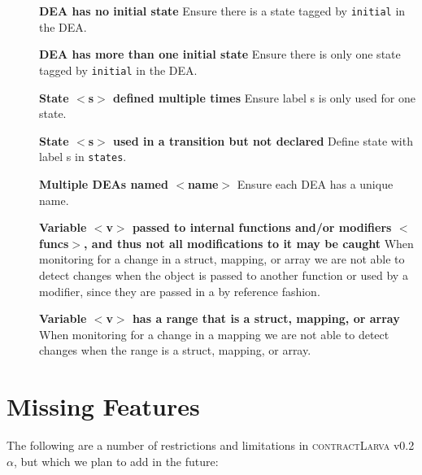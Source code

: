 \documentclass{article}
\newcommand{\contractlarva}{\textsc{contractLarva}\xspace}
\begin{document}
  \begin{description}
  	\item[] \textbf{DEA has no initial state} Ensure there is a state tagged by \texttt{initial} in the DEA.
  	\item[] \textbf{DEA has more than one initial state} Ensure there is only one state tagged by \texttt{initial} in the DEA.
  	\item[] \textbf{State $<$s$>$ defined multiple times} Ensure label s is only used for one state.
  	\item[] \textbf{State $<$s$>$ used in a transition but not declared} Define state with label s in \texttt{states}.
  	\item[] \textbf{Multiple DEAs named $<$name$>$} Ensure each DEA has a unique name.
  	\item[] \textbf{Variable $<$v$>$ passed to internal functions and/or modifiers $<$funcs$>$, and thus not all modifications to it may be caught} When monitoring for a change in a struct, mapping, or array we are not able to detect changes when the object is passed to another function or used by a modifier, since they are passed in a by reference fashion.
  	\item[] \textbf{Variable $<$v$>$ has a range that is a struct, mapping, or array} When monitoring for a change in a mapping we are not able to detect changes when the range is a struct, mapping, or array.
  \end{description}
  
  \section{Missing Features}
  \label{s:extensions}
  The following are a number of restrictions and limitations in \contractlarva v0.2$\alpha$, but which we plan to add in the future:
  
\end{document}

